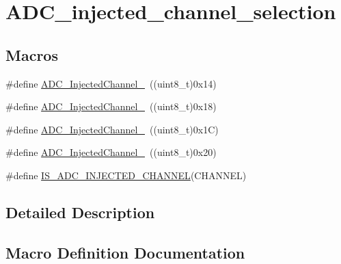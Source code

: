 \hypertarget{group___a_d_c__injected__channel__selection}{}\section{A\+D\+C\+\_\+injected\+\_\+channel\+\_\+selection}
\label{group___a_d_c__injected__channel__selection}
\subsection*{Macros}
\begin{DoxyCompactItemize}
\item 
\#define \mbox{\hyperlink{group___a_d_c__injected__channel__selection_ga8792d4ae0fa82dd317252c72815684ba}{A\+D\+C\+\_\+\+Injected\+Channel\+\_}}~((uint8\+\_\+t)0x14)
\item 
\#define \mbox{\hyperlink{group___a_d_c__injected__channel__selection_ga2e322fccc7de16a0e79be573f5b1211c}{A\+D\+C\+\_\+\+Injected\+Channel\+\_}}~((uint8\+\_\+t)0x18)
\item 
\#define \mbox{\hyperlink{group___a_d_c__injected__channel__selection_ga6bf03d805645b942bdcc53504e772cf1}{A\+D\+C\+\_\+\+Injected\+Channel\+\_}}~((uint8\+\_\+t)0x1\+C)
\item 
\#define \mbox{\hyperlink{group___a_d_c__injected__channel__selection_ga31d18bbcfa7b685e90c3a1313d9c6406}{A\+D\+C\+\_\+\+Injected\+Channel\+\_}}~((uint8\+\_\+t)0x20)
\item 
\#define \mbox{\hyperlink{group___a_d_c__injected__channel__selection_gae0bbfb5dbad0fbac8b672db6f63cf8d0}{I\+S\+\_\+\+A\+D\+C\+\_\+\+I\+N\+J\+E\+C\+T\+E\+D\+\_\+\+C\+H\+A\+N\+N\+EL}}(C\+H\+A\+N\+N\+EL)
\end{DoxyCompactItemize}


\subsection{Detailed Description}


\subsection{Macro Definition Documentation}
\mbox{\label{group___a_d_c__injected__channel__selection_ga8792d4ae0fa82dd317252c72815684ba}} 
